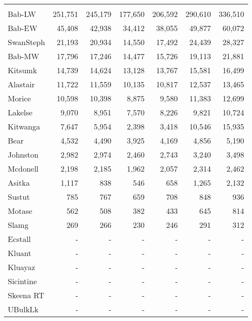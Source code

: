 \documentclass[french,11pt]{book}
\begin{document}
\begin{longtable}[t]{lrrrrrr}
\midrule\\ Bab-LW & 251,751 & 245,179 & 177,650 & 206,592 & 290,610 & 336,510\\ Bab-EW & 45,408 & 42,938 & 34,412 & 38,055 & 49,877 & 60,072\\ SwanSteph & 21,193 & 20,934 & 14,550 & 17,492 & 24,439 & 28,327\\ Bab-MW & 17,796 & 17,246 & 14,477 & 15,726 & 19,113 & 21,881\\ Kitsumk & 14,739 & 14,624 & 13,128 & 13,767 & 15,581 & 16,499\\ Alastair & 11,722 & 11,559 & 10,135 & 10,817 & 12,537 & 13,465\\ Morice & 10,598 & 10,398 & 8,875 & 9,580 & 11,383 & 12,699\\ Lakelse & 9,070 & 8,951 & 7,570 & 8,226 & 9,821 & 10,724\\ Kitwanga & 7,647 & 5,954 & 2,398 & 3,418 & 10,546 & 15,935\\ Bear & 4,532 & 4,490 & 3,925 & 4,169 & 4,856 & 5,190\\ Johnston & 2,982 & 2,974 & 2,460 & 2,743 & 3,240 & 3,498\\ Mcdonell & 2,198 & 2,185 & 1,962 & 2,057 & 2,314 & 2,462\\ Asitka & 1,117 & 838 & 546 & 658 & 1,265 & 2,132\\ Sustut & 785 & 767 & 659 & 708 & 848 & 936\\ Motase & 562 & 508 & 382 & 433 & 645 & 814\\ Slamg & 269 & 266 & 230 & 246 & 291 & 312\\ Ecstall & - & - & - & - & - & -\\ Kluant & - & - & - & - & - & -\\ Kluayaz & - & - & - & - & - & -\\ Sicintine & - & - & - & - & - & -\\ Skeena RT & - & - & - & - & - & -\\ UBulkLk & - & - & - & - & - & -\\* \end{longtable}

\endgroup{} \endgroup{}

\clearpage
\end{document}
